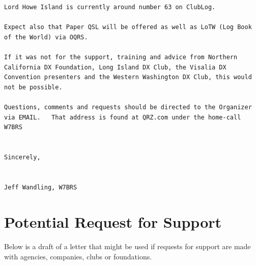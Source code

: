 \documentclass[11pt]{article}
\begin{document}
\begin{Verbatim}[fontsize=\small]
Lord Howe Island is currently around number 63 on ClubLog.

Expect also that Paper QSL will be offered as well as LoTW (Log Book
of the World) via OQRS.

If it was not for the support, training and advice from Northern 
California DX Foundation, Long Island DX Club, the Visalia DX 
Convention presenters and the Western Washington DX Club, this would 
not be possible.

Questions, comments and requests should be directed to the Organizer
via EMAIL.   That address is found at QRZ.com under the home-call
W7BRS


Sincerely,


Jeff Wandling, W7BRS
\end{Verbatim}

\section{Potential Request for Support}

Below is a draft of a letter that might be used if
requests for support are made with agencies, companies,
clubs or foundations.
\end{document}
